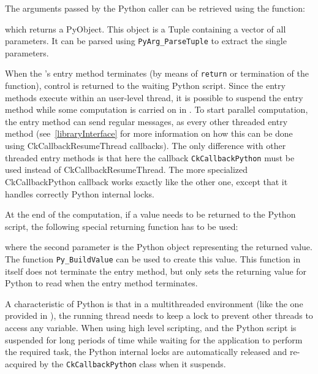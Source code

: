 The arguments passed by the Python caller can be retrieved using the function:


which returns a PyObject. This object is a Tuple containing a vector of all
parameters. It can be parsed using \texttt{PyArg\_ParseTuple} to extract the
single parameters.

When the \charmpp's entry method terminates (by means of \texttt{return} or
termination of the function), control is returned to the waiting Python script.
Since the  entry methods execute within an user-level thread, it is
possible to suspend the entry method while some computation is carried on in
\charmpp. To start parallel computation, the entry method can send regular messages,
as every other threaded entry method (see~\ref{libraryInterface} for more
information on how this can be done using CkCallbackResumeThread callbacks). The
only difference with other threaded entry methods is that here the callback
\texttt{CkCallbackPython} must be used instead of CkCallbackResumeThread. The
more specialized CkCallbackPython callback works exactly like the other one,
except that it handles correctly Python internal locks.

At the end of the computation, if a value needs to be returned to the Python script,
the following special returning function has to be used:


where the second parameter is the Python object representing the returned value.
The function \texttt{Py\_BuildValue} can be used to create this value. This
function in itself does not terminate the entry method, but only sets the
returning value for Python to read when the entry method terminates.

A characteristic of Python is that in a multithreaded environment (like the one
provided in \charmpp{}), the running thread needs to keep a lock to prevent
other threads to access any variable. When using high level scripting, and the
Python script is suspended for long periods of time while waiting for the
\charmpp{} application to perform the required task, the Python internal locks
are automatically released and re-acquired by the \texttt{CkCallbackPython}
class when it suspends.



